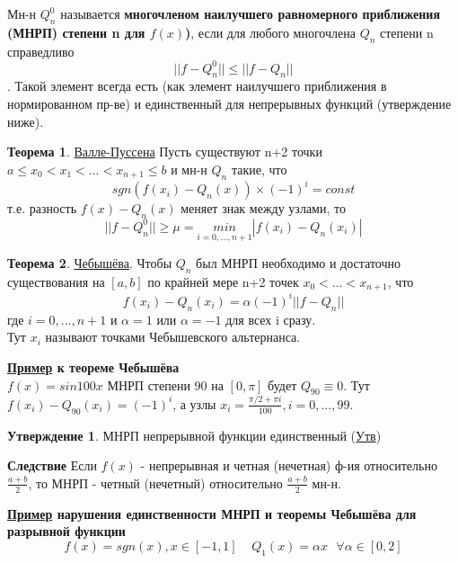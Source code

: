 \documentclass[specialist, subf, href, colorlinks=true, 12pt, times, mtpro, final]{disser}
\theoremstyle{definition}
\newtheorem{state}{Утверждение}[section]
\newtheorem{theorem}{Теорема}[section]
\begin{document}
    Мн-н $Q_n^0$ называется \textbf{многочленом наилучшего равномерного приближения (МНРП) степени n для $f(x)$)}, если для любого многочлена $Q_n$ степени n справедливо $$||f-Q_n^0|| \le ||f-Q_n||$$. Такой элемент всегда есть (как элемент наилучшего приближения в нормированном пр-ве) и единственный для непрерывных функций (утверждение ниже).
    
    \begin{theorem}
        \hyperlink {lects.35}{Валле-Пуссена} Пусть существуют n+2 точки $a \le x_0 < x_1 < ... < x_{n+1} \le b$ и мн-н $Q_n$ такие, что 
        $$
            sgn(f(x_i) - Q_n(x)) \times (-1)^i = const
        $$
        т.е. разность $f(x) - Q_n(x)$ меняет знак между узлами, то
        $$
            ||f-Q_n^0|| \ge \mu = \underset{i = 0, ..., n+1}{min} |f(x_i) - Q_n(x_i)|
        $$
    \end{theorem}
    \begin{theorem}
        \hyperlink {lects.35}{Чебышёва}. Чтобы $Q_n$ был МНРП необходимо и достаточно существования на $[a,b]$ по крайней мере n+2 точек $x_0 < ... < x_{n+1}$, что
        $$
            f(x_i) - Q_n(x_i) = \alpha (-1)^i ||f-Q_n||
        $$
        где $i = 0, ..., n+1$ и $\alpha = 1$ или $\alpha = -1$ для всех i сразу.\\
        Тут $x_i$ называют точками Чебышевского альтернанса.
    \end{theorem}

    \textbf{\hyperlink {lects.36}{Пример} к теореме Чебышёва}\\
    $f(x) = sin100x$ МНРП степени 90 на $[0,\pi]$ будет $Q_{90} \equiv 0$. Тут $f(x_i) - Q_{90}(x_i) = (-1)^i$, а узлы $x_i = \frac{\pi/2 +\pi i}{100}, i = 0, ... , 99$.
    
    \begin{state}
        МНРП непрерывной функции единственный (\hyperlink {lects.36}{Утв})
    \end{state}
    \textbf{Следствие} Если $f(x)$ - непрерывная и четная (нечетная) ф-ия относительно $\frac{a+b}{2}$, то МНРП - четный (нечетный) относительно $\frac{a+b}{2}$ мн-н.
    
    \textbf{\hyperlink {lects.36}{Пример} нарушения единственности МНРП и теоремы Чебышёва для разрывной функции}
    $$
        f(x) = sgn(x), x\in[-1,1] \ \ \ \ \ Q_1(x) = \alpha x \ \ \ \forall \alpha \in [0,2] 
    $$
    
\end{document}
